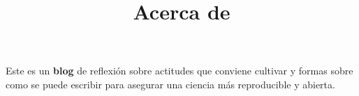 \documentclass[
  spanish,
  letterpaper,
  DIV=11,
  numbers=noendperiod]{scrartcl}
\title{Acerca de}
\author{}
\date{}
\begin{document}
\maketitle


Este es un \textbf{blog} de reflexión sobre actitudes que conviene
cultivar y formas sobre como se puede escribir para asegurar una ciencia
más reproducible y abierta.
\end{document}
